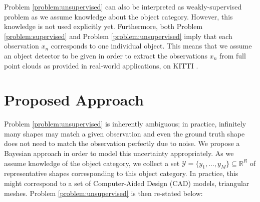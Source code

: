 Problem \ref{problem:unsupervised} can also be interpreted as weakly-supervised
problem as we assume knowledge about the object category. However, this knowledge
is not used explicitly yet. Furthermore, both
Problem \ref{problem:supervised} and Problem \ref{problem:unsupervised} imply that
each observation $x_n$ corresponds to one individual object. This
means that we assume an object detector to be given in order to extract
the observations $x_n$ from full point clouds
as provided in real-world applications, \eg on KITTI
\cite{GeigerLenzUrtasun:2012,GeigerLenzStillerUrtasun:2013}.

\section{Proposed Approach}

Problem \ref{problem:unsupervised} is inherently ambiguous; in practice, infinitely
many shapes may match a given observation and even the ground truth
shape does not need to match the observation perfectly due to noise.
We propose a Bayesian approach in order to model this uncertainty appropriately.
As we assume knowledge of the object category, we collect a set
$\mathcal{Y} = \{y_1, \ldots,y_M\} \subseteq \mathbb{R}^R$ of representative shapes
corresponding to this object category.
In practice, this might correspond to a set of Computer-Aided Design (CAD) models,
\ie triangular meshes. Problem \ref{problem:unsupervised} is then re-stated below:

